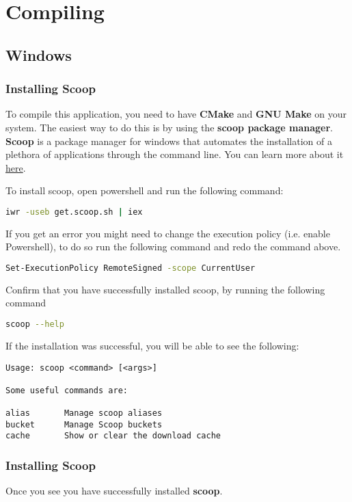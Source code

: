 \section{Compiling}
\subsection{Windows}

\subsubsection{Installing Scoop}


To compile this application, you need to have \textbf{CMake}  and \textbf{GNU
Make} on your system.  The easiest way to do this is by using the \textbf{scoop
package manager}. \textbf{Scoop} is a package manager for windows that automates the
installation of a plethora of applications through the command line. You can learn more about it
\href{https://github.com/ScoopInstaller/Scoop}{here}.

To install scoop, open powershell and run the following command:

\begin{lstlisting}[language=bash]
iwr -useb get.scoop.sh | iex
\end{lstlisting}

If you get an error you might need to change the execution policy (i.e. enable Powershell), to do so run the following command and redo the command above.

\begin{lstlisting}[language=bash]
Set-ExecutionPolicy RemoteSigned -scope CurrentUser
\end{lstlisting}

Confirm that you have successfully installed scoop, by running the following command

\begin{lstlisting}[language=bash]
scoop --help
\end{lstlisting}

If the installation was successful, you will be able to see the following:
\begin{lstlisting}
Usage: scoop <command> [<args>]

Some useful commands are:

alias       Manage scoop aliases
bucket      Manage Scoop buckets
cache       Show or clear the download cache
\end{lstlisting}

\subsubsection{Installing Scoop}
Once you see you have successfully installed \textbf{scoop}.

